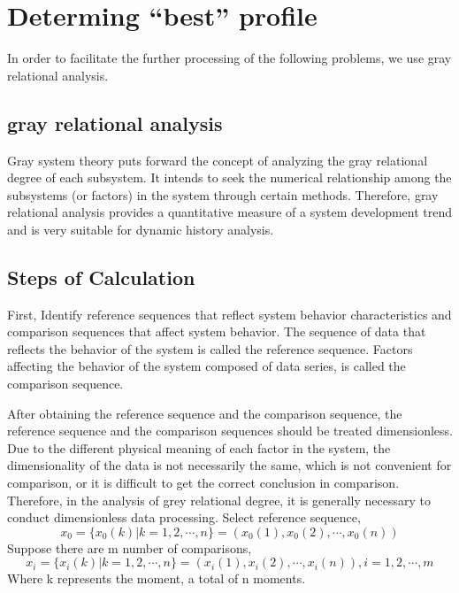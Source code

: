 \documentclass{mcmthesis}
\begin{document}
\section{Determing ``best'' profile}
In order to facilitate the further processing of the following problems, we use gray relational analysis.
\subsection{gray relational analysis}
Gray system theory puts forward the concept of analyzing the gray relational degree of each subsystem. It intends to seek the numerical relationship among the subsystems (or factors) in the system through certain methods.
Therefore, gray relational analysis provides a quantitative measure of a system development trend and is very suitable for dynamic history analysis.\cite{AZretime}

\subsection{Steps of Calculation}
First, Identify reference sequences that reflect system behavior characteristics and comparison sequences that affect system behavior.
The sequence of data that reflects the behavior of the system is called the reference sequence. Factors affecting the behavior of the system composed of data series, is called the comparison sequence.

After obtaining the reference sequence and the comparison sequence, the reference sequence and the comparison sequences should be treated dimensionless.
Due to the different physical meaning of each factor in the system, the dimensionality of the data is not necessarily the same, which is not convenient for comparison, or it is difficult to get the correct conclusion in comparison. Therefore, in the analysis of grey relational degree, it is generally necessary to conduct dimensionless data processing.
\newline
Select reference sequence,
\begin{equation}
  x_0 = \{x_0(k) | k=1,2,\cdots,n \} = (x_0(1), x_0(2), \cdots, x_0(n))
\end{equation}
Suppose there are m number of comparisons,
\begin{equation}
x_i = \{x_i(k) | k=1,2,\cdots,n\} = (x_i(1), x_i(2), \cdots, x_i(n)), i = 1,2,\cdots,m 
\end{equation}
Where k represents the moment, a total of n moments.
\end{document}
